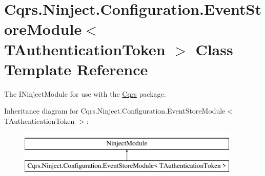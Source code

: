 \hypertarget{classCqrs_1_1Ninject_1_1Configuration_1_1EventStoreModule}{}\section{Cqrs.\+Ninject.\+Configuration.\+Event\+Store\+Module$<$ T\+Authentication\+Token $>$ Class Template Reference}
\label{classCqrs_1_1Ninject_1_1Configuration_1_1EventStoreModule}


The I\+Ninject\+Module for use with the \hyperlink{namespaceCqrs}{Cqrs} package.  


Inheritance diagram for Cqrs.\+Ninject.\+Configuration.\+Event\+Store\+Module$<$ T\+Authentication\+Token $>$\+:\begin{figure}[H]
\begin{center}
\leavevmode
\includegraphics[height=2.000000cm]{classCqrs_1_1Ninject_1_1Configuration_1_1EventStoreModule}
\end{center}
\end{figure}
